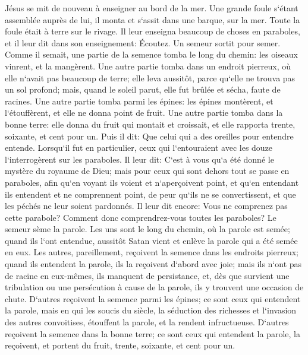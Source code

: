 \verse Jésus se mit de nouveau à enseigner au bord de la mer. Une grande foule s`étant assemblée auprès de lui, il monta et s`assit dans une barque, sur la mer. Toute la foule était à terre sur le rivage. 
\verse Il leur enseigna beaucoup de choses en paraboles, et il leur dit dans son enseignement: 
\verse Écoutez. Un semeur sortit pour semer. 
\verse Comme il semait, une partie de la semence tomba le long du chemin: les oiseaux vinrent, et la mangèrent. 
\verse Une autre partie tomba dans un endroit pierreux, où elle n`avait pas beaucoup de terre; elle leva aussitôt, parce qu`elle ne trouva pas un sol profond; 
\verse mais, quand le soleil parut, elle fut brûlée et sécha, faute de racines. 
\verse Une autre partie tomba parmi les épines: les épines montèrent, et l`étouffèrent, et elle ne donna point de fruit. 
\verse Une autre partie tomba dans la bonne terre: elle donna du fruit qui montait et croissait, et elle rapporta trente, soixante, et cent pour un. 
\verse Puis il dit: Que celui qui a des oreilles pour entendre entende. 
\verse Lorsqu`il fut en particulier, ceux qui l`entouraient avec les douze l`interrogèrent sur les paraboles. 
\verse Il leur dit: C`est à vous qu`a été donné le mystère du royaume de Dieu; mais pour ceux qui sont dehors tout se passe en paraboles, 
\verse afin qu`en voyant ils voient et n`aperçoivent point, et qu`en entendant ils entendent et ne comprennent point, de peur qu`ils ne se convertissent, et que les péchés ne leur soient pardonnés. 
\verse Il leur dit encore: Vous ne comprenez pas cette parabole? Comment donc comprendrez-vous toutes les paraboles? 
\verse Le semeur sème la parole. 
\verse Les uns sont le long du chemin, où la parole est semée; quand ils l`ont entendue, aussitôt Satan vient et enlève la parole qui a été semée en eux. 
\verse Les autres, pareillement, reçoivent la semence dans les endroits pierreux; quand ils entendent la parole, ils la reçoivent d`abord avec joie; 
\verse mais ils n`ont pas de racine en eux-mêmes, ils manquent de persistance, et, dès que survient une tribulation ou une persécution à cause de la parole, ils y trouvent une occasion de chute. 
\verse D`autres reçoivent la semence parmi les épines; ce sont ceux qui entendent la parole, 
\verse mais en qui les soucis du siècle, la séduction des richesses et l`invasion des autres convoitises, étouffent la parole, et la rendent infructueuse. 
\verse D`autres reçoivent la semence dans la bonne terre; ce sont ceux qui entendent la parole, la reçoivent, et portent du fruit, trente, soixante, et cent pour un. 

